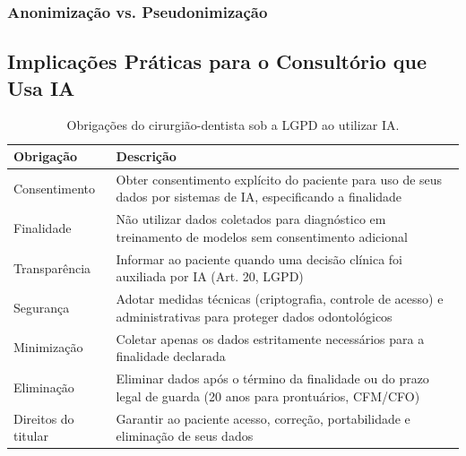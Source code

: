 \subsubsection{Anonimização vs. Pseudonimização}


\subsection{Implicações Práticas para o Consultório que Usa IA}

\begin{table}[H]
  \centering
  \caption{Obrigações do cirurgião-dentista sob a LGPD ao utilizar IA.}
  \label{tab:lgpd-ia-consultorio}
  \begin{tabularx}{\textwidth}{lX}
    \toprule
    \textbf{Obrigação} & \textbf{Descrição} \\
    \midrule
    Consentimento & Obter consentimento explícito do paciente para uso de
      seus dados por sistemas de IA, especificando a finalidade \\
    Finalidade & Não utilizar dados coletados para diagnóstico em treinamento
      de modelos sem consentimento adicional \\
    Transparência & Informar ao paciente quando uma decisão clínica foi
      auxiliada por IA (Art. 20, LGPD) \\
    Segurança & Adotar medidas técnicas (criptografia, controle de acesso) e
      administrativas para proteger dados odontológicos \\
    Minimização & Coletar apenas os dados estritamente necessários para a
      finalidade declarada \\
    Eliminação & Eliminar dados após o término da finalidade ou do prazo
      legal de guarda (20 anos para prontuários, CFM/CFO) \\
    Direitos do titular & Garantir ao paciente acesso, correção,
      portabilidade e eliminação de seus dados \\
    \bottomrule
  \end{tabularx}
\end{table}

